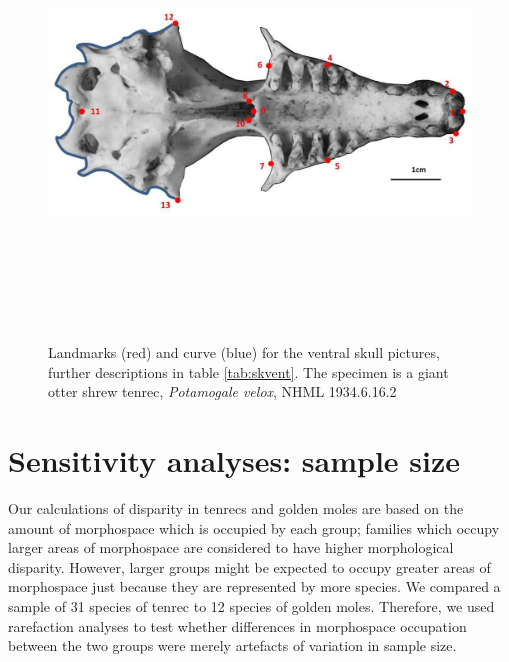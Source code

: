 \documentclass[12pt,a4paper]{article}
\begin{document}
\begin{figure}[H] 
  \centering
  \includegraphics[width=12cm, height=12cm, keepaspectratio=true]
  {figures/skvent_landmarks_pot_vel.jpg}
    \caption {Landmarks (red) and curve (blue) for the ventral skull pictures, further descriptions in table \ref{tab:skvent}. The specimen is a giant otter shrew tenrec, \textit{Potamogale velox}, NHML 1934.6.16.2}
  \label{fig:skvent_landmarks}
  \end{figure}


\begin{table}[h]
\caption{Descriptions of the landmarks (points) and curves (semilandmarks) for the skulls in ventral view (see Figure \ref{fig:skvent_landmarks}.} 

\label{tab:skvent}
\end{table}
\section{Sensitivity analyses: sample size}
Our calculations of disparity in tenrecs and golden moles are based on the amount of morphospace which is occupied by each group; families which occupy larger areas of morphospace are considered to have higher morphological disparity. However, larger groups might be expected to occupy greater areas of morphospace just because they are represented by more species. We compared a sample of 31 species of tenrec to 12 species of golden moles. Therefore, we used rarefaction analyses to test whether differences in morphospace occupation between the two groups were merely artefacts of variation in sample size.
\end{document}
